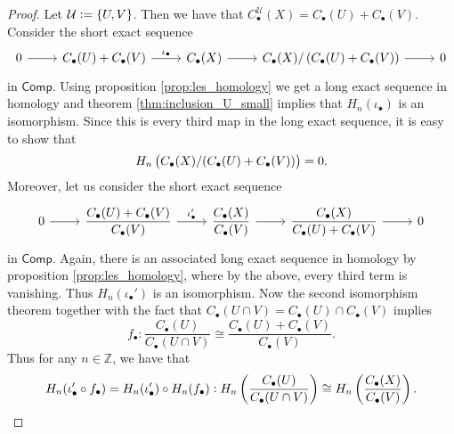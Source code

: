 \begin{proof}
	Let $\mathcal{U} := \cbr[0]{U,V}$. Then we have that $C_\bullet^\mathcal{U}(X) = C_\bullet(U) + C_\bullet(V)$. Consider the short exact sequence
	\begin{equation*}
		\begin{tikzcd}
			0 \arrow[r] & C_\bullet(U) + C_\bullet(V) \arrow[r,"\iota_\bullet"] & C_\bullet(X) \arrow[r] & C_\bullet(X)/\del[0]{C_\bullet(U) + C_\bullet(V)} \arrow[r] & 0
		\end{tikzcd}
	\end{equation*}
	\noindent in $\mathsf{Comp}$. Using proposition \ref{prop:les_homology} we get a long exact sequence in homology and theorem \ref{thm:inclusion_U_small} implies that $H_n(\iota_\bullet)$ is an isomorphism. Since this is every third map in the long exact sequence, it is easy to show that 
	\begin{equation*}
		H_n\del[1]{C_\bullet(X)/(C_\bullet(U) + C_\bullet(V))} = 0.
	\end{equation*}
	Moreover, let us consider the short exact sequence
	\begin{equation*}
		\begin{tikzcd}
			0 \arrow[r] & \displaystyle\frac{C_\bullet(U) + C_\bullet(V)}{C_\bullet(V)} \arrow[r,"\iota_\bullet'"] & \displaystyle\frac{C_\bullet(X)}{C_\bullet(V)} \arrow[r] & \displaystyle\frac{C_\bullet(X)}{C_\bullet(U) + C_\bullet(V)} \arrow[r] & 0
		\end{tikzcd}
	\end{equation*}
	\noindent in $\mathsf{Comp}$. Again, there is an associated long exact sequence in homology by proposition \ref{prop:les_homology}, where by the above, every third term is vanishing. Thus $H_n(\iota_\bullet')$ is an isomorphism. Now the second isomorphism theorem together with the fact that $C_\bullet(U \cap V) = C_\bullet(U) \cap C_\bullet(V)$ implies
	\begin{equation*}
		f_\bullet : \frac{C_\bullet(U)}{C_\bullet(U \cap V)} \cong \frac{C_\bullet(U) + C_\bullet(V)}{C_\bullet(V)}.
	\end{equation*}
	Thus for any $n \in \mathbb{Z}$, we have that 
	\begin{equation*}
		H_n(\iota_\bullet' \circ f_\bullet) = H_n(\iota_\bullet') \circ H_n(f_\bullet) : H_n\del[3]{\frac{C_\bullet(U)}{C_\bullet(U \cap V)}} \cong H_n\del[3]{\displaystyle\frac{C_\bullet(X)}{C_\bullet(V)}}.
	\end{equation*}
\end{proof}

